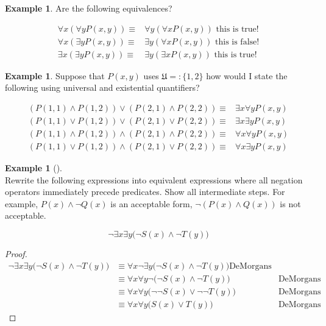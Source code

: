 \documentclass[letterpaper,10pt]{article}
\theoremstyle{plain}
\theoremstyle{definition}
\newtheorem{exmp}[thm]{Example}
\theoremstyle{remark}
\providecommand{\land}{\ensuremath{\wedge}}
\providecommand{\lor}{\ensuremath{\vee}}
\begin{document}
\begin{exmp}
Are the following equivalences?

\begin{align}
\forall x (\forall y P(x,y))\equiv & \forall y (\forall x P(x,y)) \text{ this is true!}\\
\forall x (\exists y P(x,y))\equiv & \exists y (\forall x P(x,y)) \text{ this is false!}\\
\exists x (\exists y P(x,y))\equiv & \exists y (\exists x P(x,y)) \text{ this is true!}
\end{align}
\end{exmp}
\begin{exmp}
Suppose that $P(x,y)$ uses $\mathfrak{U}=:\{1,2\}$ how would I state the following using universal and existential quantifiers?


\begin{align}
(P(1,1)\land P(1,2))\lor(P(2,1) \land P(2,2))\equiv & \exists x \forall y P(x,y)\\
(P(1,1)\lor P(1,2))\lor(P(2,1) \lor P(2,2))\equiv & \exists x \exists y P(x,y)\\
(P(1,1)\land P(1,2))\land(P(2,1) \land P(2,2))\equiv &\forall x \forall y P(x,y)\\
(P(1,1)\lor P(1,2))\land(P(2,1) \lor P(2,2))\equiv &\forall x \exists y P(x,y)
\end{align}
\end{exmp}
\newpage
\begin{exmp}[]\ \\
Rewrite the following expressions into equivalent expressions where all negation operators immediately precede predicates. Show all intermediate steps. For example, $P(x) \land \lnot Q(x)$ is an acceptable form, $\lnot(P(x) \land Q(x))$ is not acceptable.

    \[\lnot \exists x \exists y \bigl( \lnot S(x) \land \lnot T(y) \bigr)\]
    \vspace{3cm}
\begin{proof}
 \begin{align}
\lnot \exists x \exists y \bigl( \lnot S(x) \land \lnot T(y) \bigr)&\equiv \forall x \lnot \exists y \bigl( \lnot S(x) \land \lnot T(y) \bigr)\text{DeMorgans}\\
&\equiv \forall x \forall y \lnot  \bigl( \lnot S(x) \land \lnot T(y) \bigr)&\text{DeMorgans}\\
&\equiv \forall x \forall y  \bigl( \lnot \lnot S(x) \lor \lnot \lnot T(y) \bigr)&\text{DeMorgans}\\
&\equiv \forall x \forall y  \bigl( S(x) \lor T(y) \bigr)&\text{DeMorgans}
 \end{align}
\end{proof}
\end{exmp}
\end{document}
